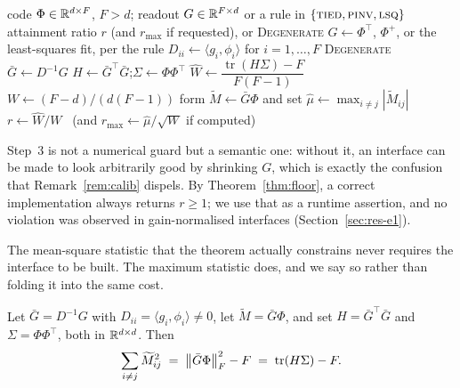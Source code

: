 \begin{algorithm}[t]
\caption{\textsc{FloorAttainment} --- how close the readout interface sits to the floor}
\label{alg:one}
\begin{algorithmic}[1]
\Require code $\Phi\in\mathbb{R}^{d\times F}$, $F>d$; readout $G\in\mathbb{R}^{F\times d}$ or a rule in
  $\{\textsc{tied},\textsc{pinv},\textsc{lsq}\}$
\Ensure attainment ratio $r$ (and $r_{\max}$ if requested), or \textsc{Degenerate}
\State $G\gets\Phi^{\top}$, $\Phi^{+}$, or the least-squares fit, per the rule
\State $D_{ii}\gets\langle g_i,\phi_i\rangle$ for $i=1,\dots,F$
 \Return \textsc{Degenerate}
\EndIf
\State $\bar G\gets D^{-1}G$ 
\State $H\gets\bar G^{\top}\bar G$;\quad $\Sigma\gets\Phi\Phi^{\top}$
\State $\widehat W\gets\dfrac{\operatorname{tr}(H\Sigma)-F}{F(F-1)}$
\State $W\gets(F-d)/(d(F-1))$ 
  \State form $\widetilde M\gets\bar G\Phi$ and set
    $\widehat\mu\gets\max_{i\neq j}|\widetilde M_{ij}|$
\EndIf
\State \Return $r\gets\widehat W/W$ \ (and $r_{\max}\gets\widehat\mu/\sqrt{W}$ if computed)
\end{algorithmic}
\end{algorithm}

Step~3 is not a numerical guard but a semantic one: without it, an interface can be made to
look arbitrarily good by shrinking $G$, which is exactly the confusion that
Remark~\ref{rem:calib} dispels. By Theorem~\ref{thm:floor}, a correct implementation always
returns $r\ge1$; we use that as a runtime assertion, and no violation was observed in
\EoneMeasurements{} gain-normalised interfaces (Section~\ref{sec:res-e1}).

The mean-square statistic that the theorem actually constrains never requires the interface to
be built. The maximum statistic does, and we say so rather than folding it into the same cost.

\begin{lemma}
\label{lem:suffstat}
Let $\bar G=D^{-1}G$ with $D_{ii}=\langle g_i,\phi_i\rangle\neq0$, let
$\widetilde M=\bar G\Phi$, and set $H=\bar G^{\top}\bar G$ and $\Sigma=\Phi\Phi^{\top}$, both
in $\mathbb{R}^{d\times d}$. Then
\[
  \sum_{i\neq j}\widetilde M_{ij}^{2}
  \;=\;\left\lVert \bar G\Phi \right\rVert_F^{2}-F
  \;=\;\operatorname{tr}(H\Sigma)-F .
\]
\end{lemma}

